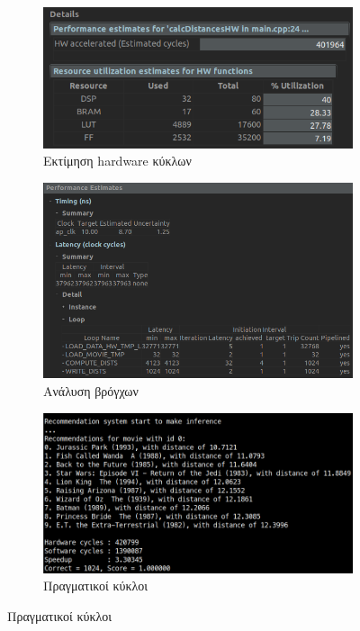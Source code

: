 \documentclass{article}
\newcommand{\eng}[1]{\foreignlanguage{english}{#1}} %
\begin{document}
\begin{figure}[ht]
   \centering
   \begin{subfigure}{0.6\textwidth}
       \includegraphics[width=\textwidth]{../photos/custom-fast/cycles.png} 
        \caption{Εκτίμηση \eng{hardware} κύκλων}
   \end{subfigure}
   \begin{subfigure}{0.6\textwidth}
       \includegraphics[width=\textwidth]{../photos/custom-fast/loops.png} 
        \caption{Ανάλυση βρόγχων}
   \end{subfigure}
   \begin{subfigure}{0.6\textwidth}
       \includegraphics[width=\textwidth]{../photos/custom-fast/results.png} 
       \caption{Πραγματικοί κύκλοι}
   \end{subfigure}
\end{figure}
\end{document}
